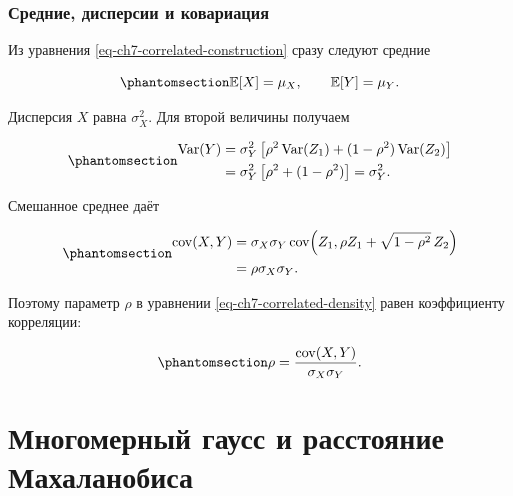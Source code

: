 \documentclass[
  russian,
  11pt,
  a4paper,
  open=any]{scrbook}
\begin{document}
\begin{bookderivation}

\subsubsection{Средние, дисперсии и
ковариация}\label{ux441ux440ux435ux434ux43dux438ux435-ux434ux438ux441ux43fux435ux440ux441ux438ux438-ux438-ux43aux43eux432ux430ux440ux438ux430ux446ux438ux44f}

Из уравнения \ref{eq-ch7-correlated-construction} сразу следуют средние

\begin{equation}\protect\phantomsection\label{eq-ch7-construction-means}{
\mathbb E[X]=\mu_X,
\qquad
\mathbb E[Y]=\mu_Y.
}\end{equation}

Дисперсия \(X\) равна \(\sigma_X^2\). Для второй величины получаем

\begin{equation}\protect\phantomsection\label{eq-ch7-construction-variance}{
\begin{aligned}
\operatorname{Var}(Y)
&=\sigma_Y^2\left[
\rho^2\operatorname{Var}(Z_1)
+(1-\rho^2)\operatorname{Var}(Z_2)
\right]\\
&=\sigma_Y^2\left[\rho^2+(1-\rho^2)\right]
=\sigma_Y^2.
\end{aligned}
}\end{equation}

Смешанное среднее даёт

\begin{equation}\protect\phantomsection\label{eq-ch7-construction-covariance}{
\begin{aligned}
\operatorname{cov}(X,Y)
&=\sigma_X\sigma_Y
\operatorname{cov}\!\left(
Z_1,\rho Z_1+\sqrt{1-\rho^2}\,Z_2
\right)\\
&=\rho\sigma_X\sigma_Y.
\end{aligned}
}\end{equation}

Поэтому параметр \(\rho\) в уравнении \ref{eq-ch7-correlated-density}
равен коэффициенту корреляции:

\begin{equation}\protect\phantomsection\label{eq-ch7-rho-definition}{
\rho=\frac{\operatorname{cov}(X,Y)}{\sigma_X\sigma_Y}.
}\end{equation}

\end{bookderivation}

\section{Многомерный гаусс и расстояние
Махаланобиса}\label{ux43cux43dux43eux433ux43eux43cux435ux440ux43dux44bux439-ux433ux430ux443ux441ux441-ux438-ux440ux430ux441ux441ux442ux43eux44fux43dux438ux435-ux43cux430ux445ux430ux43bux430ux43dux43eux431ux438ux441ux430}
\end{document}
